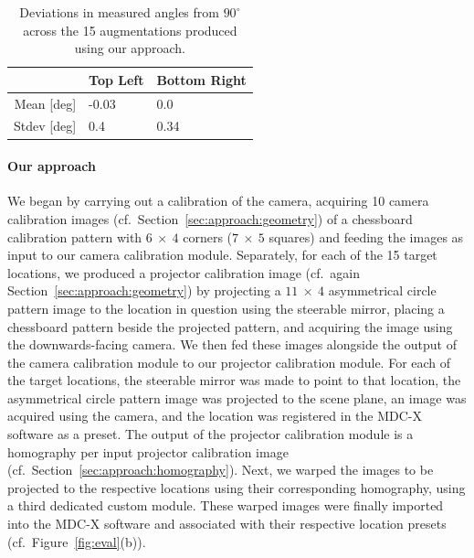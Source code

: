 \documentclass[review]{elsarticle}
\begin{document}
\begin{table}[ht]
\caption{Deviations in measured angles from $90^\circ{}$ across the 15 augmentations produced using our approach.}
\label{table:angle}
\centering
{\small
\begin{tabularx}{6.75cm}{r p{1.95cm} p{1.95cm}}
\toprule
  & Top Left & Bottom Right \\
\midrule
Mean {\tiny[deg]} & -0.03 & 0.0 \\
Stdev {\tiny[deg]} & 0.4 & 0.34 \\
\bottomrule
\end{tabularx}}
\end{table}

\paragraph{Our approach} We began by carrying out a calibration of the camera, acquiring 10 camera calibration images (cf.\ Section~\ref{sec:approach:geometry}) of a chessboard calibration pattern with $6~\times~4$ corners ($7~\times~5$ squares) and feeding the images as input to our camera calibration module. Separately, for each of the 15 target locations, we produced a projector calibration image (cf.\ again Section~\ref{sec:approach:geometry}) by projecting a $11~\times~4$ asymmetrical circle pattern image to the location in question using the steerable mirror, placing a chessboard pattern beside the projected pattern, and acquiring the image using the downwards-facing camera. We then fed these images alongside the output of the camera calibration module to our projector calibration module. For each of the target locations, the steerable mirror was made to point to that location, the asymmetrical circle pattern image was projected to the scene plane, an image was acquired using the camera, and the location was registered in the MDC-X software as a preset. The output of the projector calibration module is a homography per input projector calibration image (cf.\ Section~\ref{sec:approach:homography}). Next, we warped the images to be projected to the respective locations using their corresponding homography, using a third dedicated custom module. These warped images were finally imported into the MDC-X software and associated with their respective location presets (cf.\ Figure~\ref{fig:eval}(b)).
\end{document}
